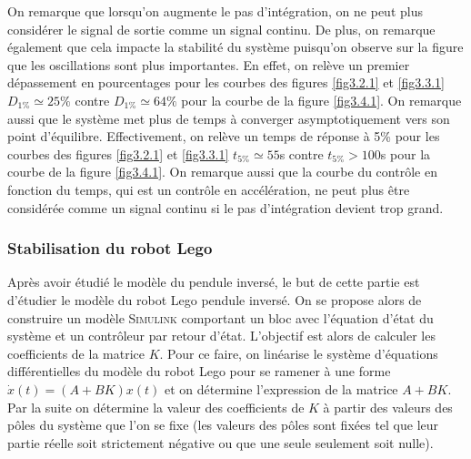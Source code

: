 \documentclass[a4paper]{article}
\begin{document}
                        On remarque que lorsqu'on augmente le pas d'intégration, on ne peut plus considérer le signal de sortie comme un signal continu.
                        De plus, on remarque également que cela impacte la stabilité du système puisqu'on observe sur la figure  
                        que les oscillations sont plus importantes. En effet, on relève un premier dépassement en pourcentages pour les courbes des
                        figures \ref{fig3.2.1} et \ref{fig3.3.1} $D_{1\%} \simeq 25\%$ contre $D_{1\%} \simeq 64\%$
                        pour la courbe de la figure \ref{fig3.4.1}.
                        On remarque aussi que le système met plus de temps à converger asymptotiquement vers son point d'équilibre.
                        Effectivement, on relève un temps de réponse à 5\% pour les courbes des figures \ref{fig3.2.1} et \ref{fig3.3.1}
                        $t_{5\%} \simeq 55$s contre $t_{5\%} > 100$s pour la courbe de la figure \ref{fig3.4.1}.
                        On remarque aussi que la courbe du contrôle en fonction du temps, qui est un contrôle en accélération,
                        ne peut plus être considérée comme un signal continu si le pas d'intégration devient trop grand. 
                    

                \subsubsection{Stabilisation du robot Lego}

                        Après avoir étudié le modèle du pendule inversé, le but de cette partie est d'étudier le modèle du robot Lego pendule inversé.
                        On se propose alors de construire un modèle \textsc{Simulink} comportant un bloc avec l'équation d'état du système et un contrôleur par retour d'état.
                        L'objectif est alors de calculer les coefficients de la matrice $K$.
                        Pour ce faire, on linéarise le système d'équations différentielles du modèle du robot Lego
                        pour se ramener à une forme $\dot x(t) = (A+BK)x(t)$ et on détermine l'expression de la matrice $A+BK$.
                        Par la suite on détermine la valeur des coefficients de $K$ à partir des valeurs des pôles du système que l'on se fixe
                        (les valeurs des pôles sont fixées tel que leur partie réelle soit strictement négative ou que une seule seulement soit nulle).
\end{document}
